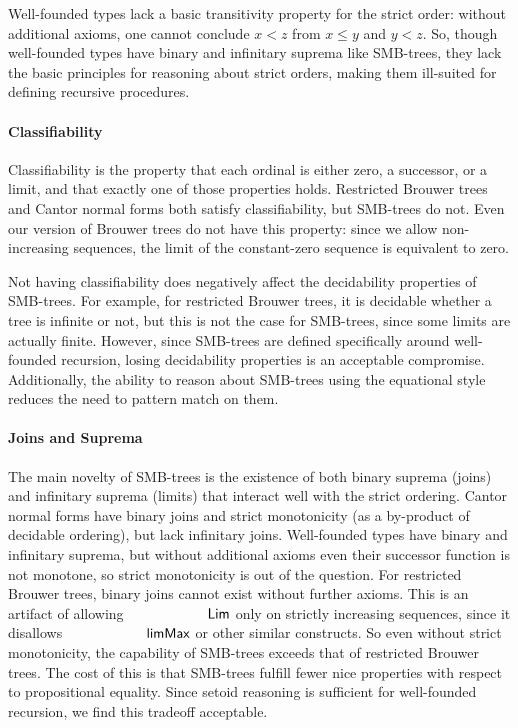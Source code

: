 Well-founded types lack a basic transitivity property for the strict order:
without additional axioms, one cannot conclude $x < z$ from $x \le y$ and $y < z$.
So, though well-founded types have binary and infinitary suprema like SMB-trees,
they lack the basic principles for reasoning about strict orders, making them ill-suited
for defining recursive procedures.

\paragraph{Classifiability}
Classifiability is the property that each ordinal is either zero, a successor,
or a limit, and that exactly one of those properties holds.
Restricted Brouwer trees and Cantor normal forms both satisfy classifiability,
but SMB-trees do not. Even our version of Brouwer trees do not have this property:
since we allow non-increasing sequences, the limit of the constant-zero sequence
is equivalent to zero.

Not having classifiability does negatively affect the decidability properties of SMB-trees.
For example, for restricted Brouwer trees, it is decidable whether a tree is
infinite or not, but this is not the case for SMB-trees, since some limits are
actually finite. However, since SMB-trees are defined specifically around
well-founded recursion, losing decidability properties is an acceptable
compromise. Additionally, the ability to reason about SMB-trees using the
equational style reduces the need to pattern match on them.

\paragraph{Joins and Suprema}

The main novelty of SMB-trees is the existence of both binary suprema (joins) and infinitary suprema (limits)
that interact well with the strict ordering.
Cantor normal forms have binary joins and strict monotonicity (as a by-product of decidable ordering),
but lack infinitary joins.
Well-founded types have binary and infinitary suprema,
but without additional axioms even their successor function is not monotone,
so strict monotonicity is out of the question.
For restricted Brouwer trees,
binary joins cannot exist without further axioms. This is an artifact of
allowing $\Lim$ only on strictly increasing sequences, since it disallows
$\limMax$ or other similar constructs.
So even without strict monotonicity, the capability of SMB-trees exceeds that of
restricted Brouwer trees. The cost of this is that SMB-trees fulfill fewer nice properties
with respect to propositional equality. Since setoid reasoning is sufficient for well-founded recursion,
we find this tradeoff acceptable.



